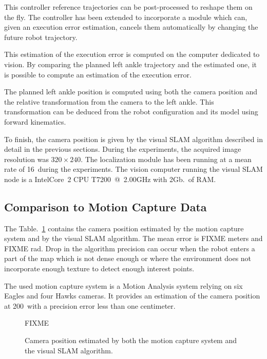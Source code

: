 This controller reference trajectories can be post-processed to
reshape them on the fly. The controller has been extended to
incorporate a module which can, given an execution error estimation,
cancels them automatically by changing the future robot trajectory.


This estimation of the execution error is computed on the computer
dedicated to vision. By comparing the planned left ankle trajectory
and the estimated one, it is possible to compute an estimation of the
execution error.

The planned left ankle position is computed using both the camera
position and the relative transformation from the camera to the left
ankle. This transformation can be deduced from the robot configuration
and its model using forward kinematics.

To finish, the camera position is given by the visual SLAM algorithm
described in detail in the previous sections. During the experiments,
the acquired image resolution was $320 \times 240$. The localization
module has been running at a mean rate of 16\hertz~during the
experiments. The vision computer running the visual SLAM node is a
Intel\textregistered Core\texttrademark\ 2 CPU T7200~@~2.00GHz with 2Gb.\ of RAM.


\subsection{Comparison to Motion Capture Data}\label{sec:mocap}

The Table.~\ref{tab:mocap_comparison} contains the camera position
estimated by the motion capture system and by the visual SLAM
algorithm. The mean error is FIXME meters and FIXME rad. Drop in the
algorithm precision can occur when the robot enters a part of the map
which is not dense enough or where the environment does not
incorporate enough texture to detect enough interest points.


The used motion capture system is a Motion Analysis system relying on
six Eagles and four Hawks cameras. It provides an estimation of the
camera position at 200\hertz~with a precision error less than one
centimeter.


\begin{figure}[ht!]
  \begin{center}
    FIXME
  \end{center}
  \caption{Camera position estimated by both the motion capture system
    and the visual SLAM algorithm. \label{tab:mocap_comparison}}
\end{figure}


